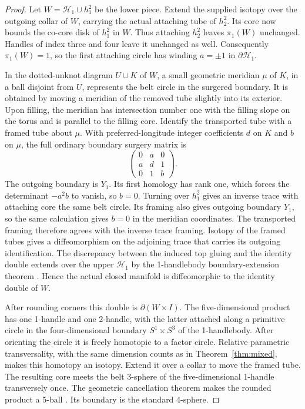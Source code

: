\documentclass[11pt,letterpaper]{article}
\numberwithin{equation}{section}
\newcommand{\HB}[1]{\mathcal H_{#1}}
\begin{document}
\begin{proof}
Let \(W=\HB{1}\cup h^2_1\) be the lower piece. Extend the supplied
isotopy over the outgoing collar of \(W\), carrying the actual
attaching tube of \(h^2_2\). Its core now bounds the co-core disk
of \(h^2_1\) in \(W\). Thus attaching \(h^2_2\) leaves
\(\pi_1(W)\) unchanged. Handles of index three and four leave it
unchanged as well. Consequently \(\pi_1(W)=1\), so the first
attaching circle has winding \(a=\pm1\) in \(\partial\HB{1}\).

In the dotted-unknot diagram \(U\cup K\) of \(W\), a small
geometric meridian \(\mu\) of \(K\), in a ball disjoint from
\(U\), represents the belt circle in the surgered boundary.
It is obtained by moving a meridian of the removed tube slightly
into its exterior. Upon filling, the meridian has intersection
number one with the filling slope on the torus and is parallel
to the filling core. Identify the transported tube with a framed
tube about \(\mu\). With preferred-longitude integer coefficients
\(d\) on \(K\) and \(b\) on \(\mu\), the full ordinary boundary
surgery matrix is
\[
 \begin{pmatrix}0&a&0\\a&d&1\\0&1&b\end{pmatrix}.
\]
The outgoing boundary is \(Y_1\). Its first homology has rank
one, which forces the determinant \(-a^2b\) to vanish, so \(b=0\).
Turning over \(h^2_1\) gives an inverse trace with attaching core
the same belt circle. Its framing also gives outgoing boundary
\(Y_1\), so the same calculation gives \(b=0\) in the meridian
coordinates. The transported framing therefore agrees with the
inverse trace framing. Isotopy of the framed tubes gives a
diffeomorphism on the adjoining trace that carries its outgoing
identification. The discrepancy between the induced top gluing
and the identity double extends over the upper \(\HB{1}\) by the
1-handlebody boundary-extension theorem
\cite[proof of Theorem A, pp.~341--342]{LaudenbachPoenaru1972Handlebodies}.
Hence the actual closed manifold is diffeomorphic to the identity
double of \(W\).

After rounding corners this double is \(\partial(W\times I)\).
The five-dimensional product has one 1-handle and one 2-handle,
with the latter attached along a primitive circle in the
four-dimensional boundary \(S^1\times S^3\) of the 1-handlebody.
After orienting the circle it is freely homotopic to a factor
circle. Relative parametric transversality, with the same
dimension counts as in Theorem~\ref{thm:mixed}, makes this
homotopy an isotopy. Extend it over a collar to move the framed
tube. The resulting core meets the belt 3-sphere of the
five-dimensional 1-handle transversely once. The geometric
cancellation theorem makes the rounded product a 5-ball
\cite[Theorem 5.4]{Milnor1965HCobordism}. Its boundary is the
standard 4-sphere.
\end{proof}
\end{document}
